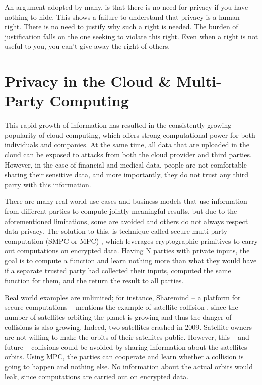 An argument adopted by many, is that there is no need for privacy if you have nothing to hide.
This shows a failure to understand that privacy is a human right.
There is no need to justify why such a right is needed.
The burden of justification falls on the one seeking to violate this right.
Even when a right is not useful to you, you can't give away the right of others.


\section{Privacy in the Cloud \& Multi-Party Computing}\label{s:privacy-cloud-multiparty}

This rapid growth of information has resulted in the consistently growing popularity of cloud computing, which offers strong computational power for both individuals and companies.
At the same time, all data that are uploaded in the cloud can be exposed to attacks from both the cloud provider and third parties.
However, in the case of financial and medical data, people are not comfortable sharing their sensitive data, and more importantly, they do not trust any third party with this information.

There are many real world use cases and business models that use information from different parties to compute jointly meaningful results, but due to the aforementioned limitations, some are avoided and others do not always respect data privacy.
The solution to this, is technique called secure multi-party computation (SMPC or MPC) \cite{yao1982protocols, goldreich1998secure}, which leverages cryptographic primitives to carry out computations on encrypted data.
Having N parties with private inputs, the goal is to compute a function and learn nothing more than what they would have if a separate trusted party had collected their inputs, computed the same function for them, and the return the result to all parties.

Real world examples are unlimited; for instance, Sharemind \cite{bogdanov2008sharemind} -- a platform for secure computations -- mentions the example of satellite collision \cite{kamm2015secure}, since the number of satellites orbiting the planet is growing and thus the danger of collisions is also growing.
Indeed, two satellites crashed in 2009.
Satellite owners are not willing to make the orbits of their satellites public.
However, this -- and future -- collisions could be avoided by sharing information about the satellites orbits.
Using MPC, the parties can cooperate and learn whether a collision is going to happen and nothing else.
No information about the actual orbits would leak, since computations are carried out on encrypted data.


